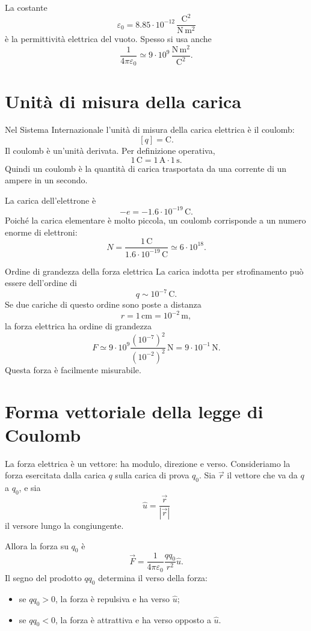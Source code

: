 \documentclass[a4paper]{article}
\begin{document}
La costante
\[
    \varepsilon_0=8.85\cdot10^{-12}\,\frac{\mathrm{C}^2}{\mathrm{N}\,\mathrm{m}^2}
\]
è la permittività elettrica del vuoto. Spesso si usa anche
\[
    \frac{1}{4\pi\varepsilon_0}\simeq 9\cdot10^9\,\frac{\mathrm{N}\,\mathrm{m}^2}{\mathrm{C}^2}.
\]

\section{Unità di misura della carica}

Nel Sistema Internazionale l'unità di misura della carica elettrica è il coulomb:
\[
    [ q ]=\mathrm{C}.
\]
Il coulomb è un'unità derivata. Per definizione operativa,
\[
    1\,\mathrm{C}=1\,\mathrm{A}\cdot1\,\mathrm{s}.
\]
Quindi un coulomb è la quantità di carica trasportata da una corrente di un ampere in un secondo.

La carica dell'elettrone è
\[
    -e=-1.6\cdot10^{-19}\,\mathrm{C}.
\]
Poiché la carica elementare è molto piccola, un coulomb corrisponde a un numero enorme di elettroni:
\[
    N=\frac{1\,\mathrm{C}}{1.6\cdot10^{-19}\,\mathrm{C}}
    \simeq 6\cdot10^{18}.
\]

\begin{snippetexample}{Ordine di grandezza della forza elettrica}
    La carica indotta per strofinamento può essere dell'ordine di
    \[
        q\sim 10^{-7}\,\mathrm{C}.
    \]
    Se due cariche di questo ordine sono poste a distanza
    \[
        r=1\,\mathrm{cm}=10^{-2}\,\mathrm{m},
    \]
    la forza elettrica ha ordine di grandezza
    \[
        F\simeq 9\cdot10^9\frac{(10^{-7})^2}{(10^{-2})^2}\,\mathrm{N}
        =9\cdot10^{-1}\,\mathrm{N}.
    \]
    Questa forza è facilmente misurabile.
\end{snippetexample}

\section{Forma vettoriale della legge di Coulomb}

La forza elettrica è un vettore: ha modulo, direzione e verso. Consideriamo la forza esercitata dalla carica \(q\) sulla carica di prova \(q_0\). Sia \(\vec{r}\) il vettore che va da \(q\) a \(q_0\), e sia
\[
    \hat{u}=\frac{\vec{r}}{|\vec{r}|}
\]
il versore lungo la congiungente.

Allora la forza su \(q_0\) è
\[
    \vec{F}=\frac{1}{4\pi\varepsilon_0}\frac{qq_0}{r^2}\hat{u}.
\]
Il segno del prodotto \(qq_0\) determina il verso della forza:
\begin{itemize}
    \item se \(qq_0>0\), la forza è repulsiva e ha verso \(\hat{u}\);
    \item se \(qq_0<0\), la forza è attrattiva e ha verso opposto a \(\hat{u}\).
\end{itemize}
\end{document}
